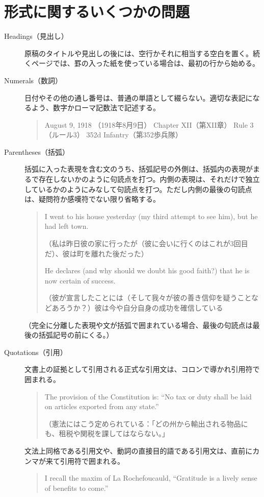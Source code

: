 \chapter{形式に関するいくつかの問題}
\begin{description}
 \item [Headings（見出し）]原稿のタイトルや見出しの後には、空行かそれに相当する空白を置く。続くページでは、罫の入った紙を使っている場合は、最初の行から始める。
 \item [Numerals（数詞）]日付やその他の通し番号は、普通の単語として綴らない。適切な表記になるよう、数字かローマ記数法で記述する。
 \begin{quote}
     August 9, 1918 （1918年8月9日）
     Chapter XII（第XII章）
     Rule 3（ルール3）
     352d Infantry（第352歩兵隊）
 \end{quote}
 \item [Parentheses（括弧）]括弧に入った表現を含む文のうち、括弧記号の外側は、括弧内の表現がまるで存在しないかのように句読点を打つ。内側の表現は、それだけで独立しているかのようにみなして句読点を打つ。ただし内側の最後の句読点は、疑問符か感嘆符でない限り省略する。
 \begin{quote}
     I went to his house yesterday (my third attempt to see him), but
he had left town.

（私は昨日彼の家に行ったが（彼に会いに行くのはこれが3回目だ）、彼は町を離れた後だった）

He declares (and why should we doubt his good faith?) that he is
now certain of success.

（彼が宣言したことには（そして我々が彼の善き信仰を疑うことなどあろうか？）彼は今や自分自身の成功を確信している
 \end{quote}
 （完全に分離した表現や文が括弧で囲まれている場合、最後の句読点は最後の括弧記号の前にくる。）
\item [Quotations（引用）]
文書上の証拠として引用される正式な引用文は、コロンで導かれ引用符で囲まれる。
\begin{quote}
    The provision of the Constitution is: ``No tax or duty shall be
laid on articles exported from any state.''

（憲法にはこう定められている：「どの州から輸出される物品にも、租税や関税を課してはならない。」
\end{quote}
文法上同格である引用文や、動詞の直接目的語である引用文は、直前にカンマが来て引用符で囲まれる。
\begin{quote}
    I recall the maxim of La Rochefoucauld, ``Gratitude is a lively
sense of benefits to come.''


\end{quote}
\end{description}
